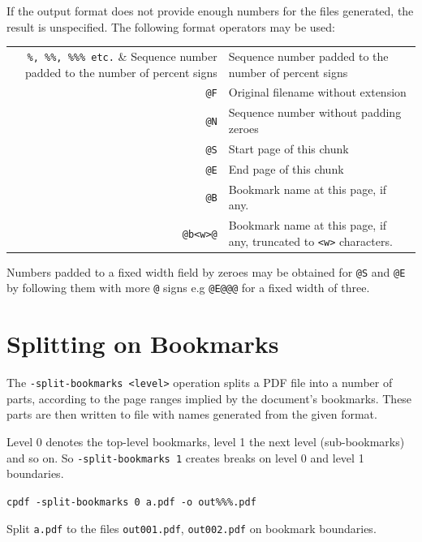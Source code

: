 \documentclass{book}
\begin{document}
  \noindent If the output format does not provide enough numbers for the files generated,
the result is unspecified. The following format operators may be used:

\begin{center}
\begin{tabular}{rl}
  \verb!%, %%, %%% etc.! & Sequence number padded to the number of percent signs\\
  \texttt{@F} & Original filename without extension \\
  \texttt{@N} & Sequence number without padding zeroes \\
  \texttt{@S} & Start page of this chunk \\
  \texttt{@E} & End page of this chunk \\
  \texttt{@B} & Bookmark name at this page, if any. \\
  \texttt{@b<w>@} & Bookmark name at this page, if any, truncated to \texttt{<w>} characters.\\
\end{tabular}
\end{center}

\noindent Numbers padded to a fixed width field by zeroes may be obtained for \texttt{@S} and \texttt{@E} by following them with more \texttt{@} signs e.g \texttt{@E@@@} for a fixed width of three.

  \section{Splitting on Bookmarks}
  The \texttt{-split-bookmarks <level>} operation splits a PDF file into a number of
parts, according to the page ranges implied by the document's bookmarks. These
parts are then written to file with names generated from the given format.
  
Level 0 denotes the top-level bookmarks, level 1 the next level (sub-bookmarks)
and so on. So \texttt{-split-bookmarks 1} creates breaks on level 0 and level
1 boundaries.

  \begin{framed}\small
    \noindent\verb!cpdf -split-bookmarks 0 a.pdf -o out%%%.pdf!

    \vspace{2.5mm}
    \noindent Split \texttt{a.pdf} to the files \texttt{out001.pdf},
\texttt{out002.pdf} on bookmark boundaries.

  \end{framed}
\end{document}
